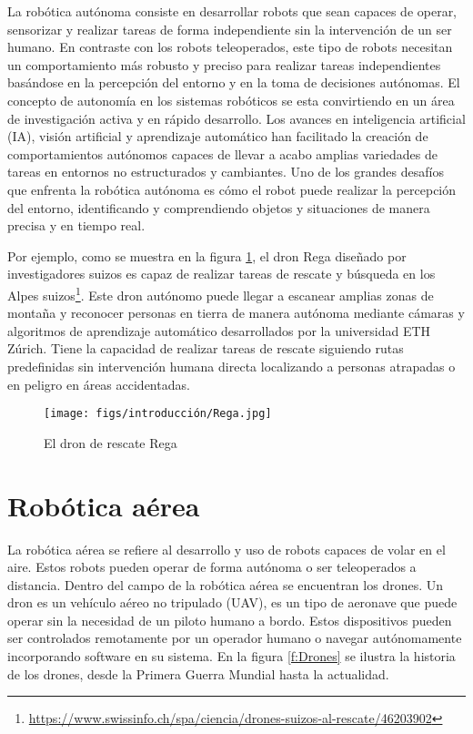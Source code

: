 La robótica autónoma consiste en desarrollar robots que sean capaces de operar, sensorizar y realizar tareas de forma independiente sin la intervención de un ser humano. En contraste con los 
robots teleoperados, este tipo de robots necesitan un comportamiento más robusto y preciso para realizar tareas independientes basándose en la percepción del entorno 
y en la toma de decisiones autónomas.
El concepto de autonomía en los sistemas robóticos se esta convirtiendo en un área de investigación activa y en rápido desarrollo. Los avances en inteligencia artificial (IA), visión 
artificial y aprendizaje automático han facilitado la creación de comportamientos autónomos capaces de llevar a acabo amplias variedades de tareas en entornos no estructurados y cambiantes. 
Uno de los grandes desafíos que enfrenta la robótica autónoma es cómo el robot puede realizar la percepción del entorno, identificando y comprendiendo objetos y situaciones de manera
precisa y en tiempo real. 

Por ejemplo, como se muestra en la figura \ref{fig:Rega}, el dron Rega diseñado por investigadores suizos es capaz de realizar tareas de 
rescate y búsqueda en los Alpes suizos\footnote{\url{https://www.swissinfo.ch/spa/ciencia/drones-suizos-al-rescate/46203902}}. Este dron autónomo puede llegar a 
escanear amplias zonas de montaña y reconocer personas en tierra de manera autónoma mediante
cámaras y algoritmos de aprendizaje automático desarrollados por la universidad ETH Zúrich. Tiene la capacidad de realizar tareas de rescate siguiendo rutas
predefinidas sin intervención humana directa localizando a personas atrapadas o en peligro en áreas accidentadas.

\begin{figure} [H]
  \begin{center}
    \texttt{[image: figs/introducción/Rega.jpg]}
  \end{center}
  \caption{El dron de rescate Rega}
  \label{fig:Rega}
  \vspace{-1.5em}
\end{figure}

\section{Robótica aérea}
\label{sec:subseccion}
La robótica aérea se refiere al desarrollo y uso de robots capaces de volar en el aire. Estos robots pueden operar de forma autónoma o ser teleoperados a distancia.
Dentro del campo de la robótica aérea se encuentran los drones. Un dron es un vehículo aéreo no tripulado (UAV), es un tipo de aeronave que puede operar sin la 
necesidad de un piloto humano a bordo. Estos dispositivos pueden ser controlados remotamente por un operador humano o navegar autónomamente incorporando software 
en su sistema. En la figura \ref{f:Drones} se ilustra la historia de los drones, desde la Primera Guerra Mundial hasta la actualidad.

